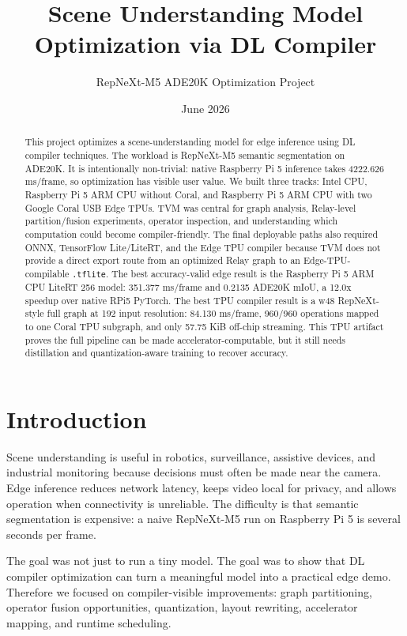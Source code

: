 \documentclass[11pt]{article}
\title{Scene Understanding Model Optimization via DL Compiler}
\author{RepNeXt-M5 ADE20K Optimization Project}
\date{June 2026}
\begin{document}
\maketitle

\begin{abstract}
This project optimizes a scene-understanding model for edge inference using DL compiler techniques. The workload is RepNeXt-M5 semantic segmentation on ADE20K. It is intentionally non-trivial: native Raspberry Pi 5 inference takes 4222.626 ms/frame, so optimization has visible user value. We built three tracks: Intel CPU, Raspberry Pi 5 ARM CPU without Coral, and Raspberry Pi 5 ARM CPU with two Google Coral USB Edge TPUs. TVM was central for graph analysis, Relay-level partition/fusion experiments, operator inspection, and understanding which computation could become compiler-friendly. The final deployable paths also required ONNX, TensorFlow Lite/LiteRT, and the Edge TPU compiler because TVM does not provide a direct export route from an optimized Relay graph to an Edge-TPU-compilable \texttt{.tflite}. The best accuracy-valid edge result is the Raspberry Pi 5 ARM CPU LiteRT 256 model: 351.377 ms/frame and 0.2135 ADE20K mIoU, a 12.0x speedup over native RPi5 PyTorch. The best TPU compiler result is a w48 RepNeXt-style full graph at 192 input resolution: 84.130 ms/frame, 960/960 operations mapped to one Coral TPU subgraph, and only 57.75 KiB off-chip streaming. This TPU artifact proves the full pipeline can be made accelerator-computable, but it still needs distillation and quantization-aware training to recover accuracy.
\end{abstract}

\section{Introduction}

Scene understanding is useful in robotics, surveillance, assistive devices, and industrial monitoring because decisions must often be made near the camera. Edge inference reduces network latency, keeps video local for privacy, and allows operation when connectivity is unreliable. The difficulty is that semantic segmentation is expensive: a naive RepNeXt-M5 run on Raspberry Pi 5 is several seconds per frame.

The goal was not just to run a tiny model. The goal was to show that DL compiler optimization can turn a meaningful model into a practical edge demo. Therefore we focused on compiler-visible improvements: graph partitioning, operator fusion opportunities, quantization, layout rewriting, accelerator mapping, and runtime scheduling.
\end{document}
